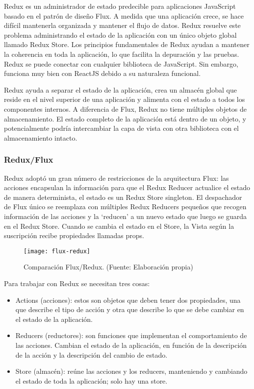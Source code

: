 Redux es un administrador de estado predecible para aplicaciones JavaScript basado en el patrón de diseño Flux. A medida que una aplicación crece, se hace difícil mantenerla organizada y mantener el flujo de datos. Redux resuelve este problema administrando el estado de la aplicación con un único objeto global llamado Redux Store. Los principios fundamentales de Redux ayudan a mantener la coherencia en toda la aplicación, lo que facilita la depuración y las pruebas. Redux se puede conectar con cualquier biblioteca de JavaScript. Sin embargo, funciona muy bien con ReactJS debido a su naturaleza funcional.
\vspace{0.8cm}

Redux ayuda a separar el estado de la aplicación, crea un almacén global que reside en el nivel superior de una aplicación y alimenta con el estado a todos los componentes internos. A diferencia de Flux, Redux no tiene múltiples objetos de almacenamiento. El estado completo de la aplicación está dentro de un objeto, y potencialmente podría intercambiar la capa de vista con otra biblioteca con el almacenamiento intacto.

\subsubsection{Redux/Flux}
Redux adoptó un gran número de restricciones de la arquitectura Flux: las acciones encapsulan la información para que el Redux Reducer actualice el estado de manera determinista, el estado es un Redux Store \gls{singleton}. El despachador de Flux único se reemplaza con múltiples Redux Reducers pequeños que recogen información de las acciones y la `reducen' a un nuevo estado que luego se guarda en el Redux Store. Cuando se cambia el estado en el Store, la Vista según la suscripción recibe propiedades llamadas props.
\vspace{0.8cm}

\begin{figure}[H]
  \centering
  \texttt{[image: flux-redux]}
  \caption{Comparación Flux/Redux. (Fuente: Elaboración propia)}
\end{figure}
\vspace{0.8cm}

Para trabajar con Redux se necesitan tres cosas:
\begin{itemize}
  \item Actions (acciones): estos son objetos que deben tener dos propiedades, una que describe el tipo de acción y otra que describe lo que se debe cambiar en el estado de la aplicación.

  \item Reducers (reductores): son funciones que implementan el comportamiento de las acciones. Cambian el estado de la aplicación, en función de la descripción de la acción y la descripción del cambio de estado.

  \item Store (almacén): reúne las acciones y los reducers, manteniendo y cambiando el estado de toda la aplicación; solo hay una store.
\end{itemize}

